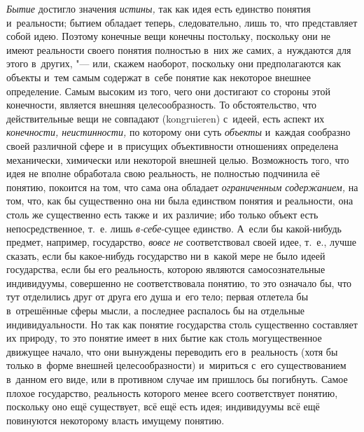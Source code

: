 {\em Бытие} достигло
значения {\em истины,}
так как идея есть единство понятия и~реальности; бытием
обладает теперь, следовательно, лишь то, что представляет собой идею.
Поэтому конечные вещи конечны постольку, поскольку они не имеют реальности
своего понятия полностью в~них же самих, а~нуждаются для этого в~других, "---
или, скажем наоборот, поскольку они предполагаются как
объекты и~тем самым содержат в~себе понятие как некоторое внешнее
определение. Самым высоким из того, чего они достигают со стороны этой
конечности, является внешняя целесообразность. То обстоятельство, что
действительные вещи не совпадают (kongruieren) с~идеей, есть
аспект их {\em конечности,
неистинности,} по которому они суть
{\em объекты} и~каждая
сообразно своей различной сфере и~в присущих объективности отношениях
определена механически, химически или некоторой внешней целью. Возможность
того, что идея не вполне обработала свою реальность, не полностью подчинила
её понятию, покоится на том, что сама она обладает
{\em ограниченным содержанием,}
на том, что, как бы существенно она ни была единством понятия
и реальности, она столь же существенно есть также и~их различие; ибо
только объект есть непосредственное, т.~е. лишь
{\em в-себе}-сущее
единство. А~если бы какой-нибудь предмет, например, государство,
{\em вовсе не}
соответствовал своей идее, т.~е., лучше сказать, если бы
какое-нибудь государство ни в~какой мере не было идеей государства, если бы
его реальность, которою являются самосознательные индивидуумы, совершенно
не соответствовала понятию, то это означало бы, что тут отделились друг от
друга его душа и~его тело; первая отлетела бы в~отрешённые сферы мысли, а
последнее распалось бы на отдельные индивидуальности. Но так как понятие
государства столь существенно составляет их природу, то это понятие имеет в
них бытие как столь могущественное движущее начало, что они вынуждены
переводить его в~реальность (хотя бы только в~форме внешней
целесообразности) и~мириться с~его существованием в~данном его виде, или в
противном случае им пришлось бы погибнуть. Самое плохое государство,
реальность которого менее всего соответствует понятию, поскольку оно ещё
существует, всё ещё есть идея; индивидуумы всё ещё повинуются некоторому
власть имущему понятию.


